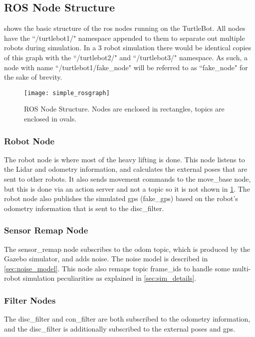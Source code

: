 \documentclass[thesis.tex]{subfile}
\begin{document}
\subsection{ROS Node Structure}
 shows the basic structure of the \gls{ros} nodes running on the TurtleBot. All nodes have the ``/turtlebot1/" namespace appended to them to separate out multiple robots during simulation. In a 3 robot simulation there would be identical copies of this graph with the ``/turtlebot2/" and ``/turtlebot3/" namespace. As such, a node with name ``/turtlebot1/fake\_node" will be referred to as ``fake\_node" for the sake of brevity.
 
\begin{landscape}
\begin{figure}[p]
\texttt{[image: simple\_rosgraph]}
\caption{ROS Node Structure. Nodes are enclosed in rectangles, topics are enclosed in ovals.}
\label{fig:node_graph}
\end{figure}
\end{landscape}

\subsubsection{Robot Node}
The robot node is where most of the heavy lifting is done. This node listens to the Lidar and odometry information, and calculates the external poses that are sent to other robots. It also sends movement commands to the move\_base node, but this is done via an action server and not a topic so it is not shown in \cref{fig:node_graph}. The robot node also publishes the simulated \gls{gps} (fake\_gps) based on the robot's odometry information that is sent to the \gls{disc_filter}.

\subsubsection{Sensor Remap Node}
The sensor\_remap node subscribes to the odom topic, which is produced by the Gazebo simulator, and adds noise. The noise model is described in \cref{sec:noise_model}. This node also remaps topic frame\_ids to handle some multi-robot simulation peculiarities as explained in \cref{sec:sim_details}.

\subsubsection{Filter Nodes}
The \gls{disc_filter} and \gls{con_filter} are both subscribed to the odometry information, and the \gls{disc_filter} is additionally subscribed to the external poses and \gls{gps}.
\end{document}
